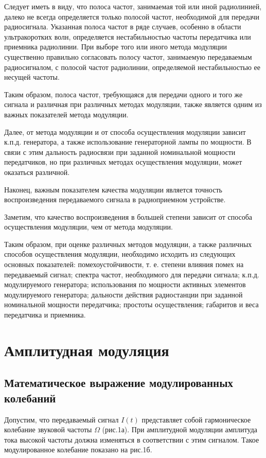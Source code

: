 Следует иметь в виду, что полоса частот, занимаемая той или иной радиолинией, далеко не всегда определяется только полосой частот, необходимой для передачи радиосигнала. Указанная полоса частот в ряде случаев, особенно в области ультракоротких волн, определяется нестабильностью частоты передатчика или приемника радиолинии. При выборе
того или иного метода модуляции существенно правильно согласовать полосу частот, занимаемую передаваемым радиосигналом, с полосой частот радиолинии, определяемой нестабильностью ее несущей частоты.

Таким образом, полоса частот, требующаяся для передачи одного и того же сигнала и различная при различных методах модуляции, также является одним из важных показателей метода модуляции.

Далее, от метода модуляции и от способа осуществления модуляции зависит к.п.д. генератора, а также использование генераторной лампы по мощности. В связи с этим дальность радиосвязи при заданной номинальной мощности передатчиков, но при различных методах осуществления модуляции, может оказаться различной.

Наконец, важным показателем качества модуляции является точность воспроизведения передаваемого сигнала в радиоприемном устройстве. 

Заметим, что качество воспроизведения в большей степени зависит от способа осуществления модуляции, чем от метода модуляции.

Таким образом, при оценке различных методов модуляции, а также различных способов осуществления модуляции, необходимо исходить из следующих основных показателей: помехоустойчивости, т. е. степени влияния помех на передаваемый сигнал; спектра частот, необходимого для передачи сигнала; к.п.д. модулируемого генератора; использования по мощности активных элементов модулируемого генератора; дальности действия радиостанции при заданной номинальной мощности передатчика; простоты
осуществления; габаритов и веса передатчика и приемника.

\section{Амплитудная модуляция}
\subsection{Математическое выражение модулированных колебаний}

Допустим, что передаваемый сигнал $I(t)$ представляет собой гармоническое колебание звуковой частоты $\Omega$ (рис.1а). При амплитудной модуляции амплитуда тока высокой частоты должна изменяться в соответствии с этим сигналом. Такое модулированное колебание показано на рис.1б.

